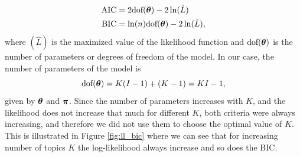 \documentclass[12pt]{article}
\begin{document}
\begin{align}
\mathrm { AIC } & = 2 \text{dof}(\boldsymbol\theta) - 2 \ln ( \hat { L } )\\
\mathrm { BIC } & = \ln ( n )\text{dof}(\boldsymbol\theta)- 2 \ln ( \hat { L } ), 
\end{align}
where $ ( \hat { L } )$ is the maximized value of the likelihood function and $\text{dof}(\boldsymbol\theta)$ is the number of parameters or degrees of freedom of the model. In our case, the number of parameters of the model is 
\begin{equation}
\text{dof}(\boldsymbol\theta) = K(I-1) + (K-1) = KI-1,
\end{equation}
given by $\boldsymbol\theta$ and $\boldsymbol\pi$. Since the number of parameters increases with $K$, and the likelihood does not increase that much for different $K$, both criteria were always increasing, and therefore we did not use them to choose the optimal value of $K$. This is illustrated in Figure \ref{fig:ll_bic} where we can see that for increasing number of topics $K$ the log-likelihood always increase and so does the BIC.
\end{document}
